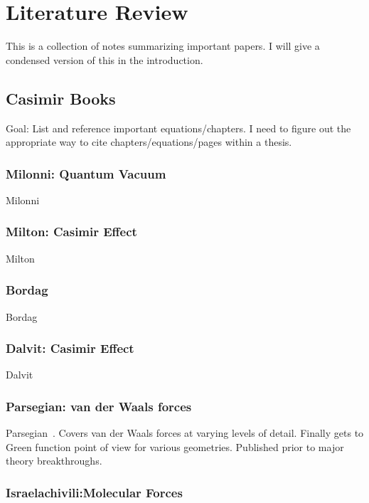 \chapter{Literature Review}

This is a collection of notes summarizing important papers.  I will give a condensed version of this in the introduction.  

\section{Casimir Books}

Goal: List and reference important equations/chapters.  
I need to figure out the appropriate way to cite chapters/equations/pages within a thesis.  

\subsection{Milonni: Quantum Vacuum}

Milonni~\cite{Milonni1994}

\subsection{Milton: Casimir Effect}
Milton~\cite{Milton2001}

\subsection{Bordag}
Bordag~\cite{Bordag2009}

\subsection{Dalvit: Casimir Effect}
Dalvit~\cite{Dalvit2011}

\subsection{Parsegian: van der Waals forces}

Parsegian~\cite{Parsegian2006}.
Covers van der Waals forces at varying levels of detail.  Finally gets to Green function
point of view for various geometries.  Published prior to major theory breakthroughs.  

\subsection{Israelachivili:Molecular Forces}

